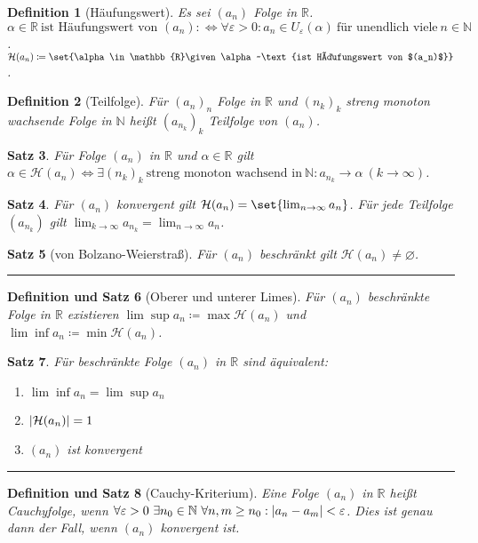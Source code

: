\documentclass[a4paper]{article}
\newcounter{Sec}
\theoremstyle{marginbreak}
\newtheorem{definition}{Definition}[Sec]
\newtheorem{satz}[definition]{Satz}
\newtheorem{defsatz}[definition]{Definition und Satz}
\newcommand{\sep}{%
	\rule{\textwidth}{0.3pt}%
	\stepcounter{Sec}%
	}
\newcommand{\defiff}{:\Longleftrightarrow}
\begin{document}
	\begin{definition}[Häufungswert]
		Es sei $(a_n)$ Folge in $\mathbb{R}$. $\alpha\in\mathbb{R}~\text{ist Häufungswert von $(a_n)$}\defiff\forall\varepsilon>0:a_n\in
		U_\varepsilon(\alpha)~\text{für unendlich viele}~n\in\mathbb{N}$. $\mathcal{H}(a_n)\coloneqq\set{\alpha\in\mathbb{R}\given
		\alpha~\text{ist Häufungswert von $(a_n)$}}$.
	\end{definition}
	\begin{definition}[Teilfolge]
		Für $(a_n)_n$ Folge in $\mathbb{R}$ und $(n_k)_k$ streng monoton wachsende
		Folge in $\mathbb{N}$ heißt $(a_{n_k})_k$ Teilfolge von $(a_n)$.
	\end{definition}
	\begin{satz}
		Für Folge $(a_n)$ in $\mathbb{R}$ und $\alpha\in\mathbb{R}$ gilt
		$\alpha\in\mathcal{H}(a_n)\iff\exists (n_k)_k~\text{streng monoton wachsend in}~\mathbb{N}:a_{n_k}\to\alpha~(k\to\infty)$.
	\end{satz}
	\begin{satz}
		Für $(a_n)$ konvergent gilt $\mathcal{H}(a_n)=\set{\lim_{n\to\infty} a_n}$. Für jede Teilfolge $(a_{n_k})$ gilt
		$\lim_{k\to\infty} a_{n_k} = \lim_{n\to\infty} a_n$.
	\end{satz}
	\begin{satz}[von Bolzano-Weierstraß]
		Für $(a_n)$ beschränkt gilt $\mathcal{H}(a_n)\neq\varnothing$.
	\end{satz}
	\sep
	\begin{defsatz}[Oberer und unterer Limes]
		Für $(a_n)$ beschränkte Folge in $\mathbb{R}$ existieren $\lim\sup a_n\coloneqq\max\mathcal{H}(a_n)$
		und $\lim\inf a_n\coloneqq\min\mathcal{H}(a_n)$.
	\end{defsatz}
	\begin{satz}
		Für beschränkte Folge $(a_n)$ in $\mathbb{R}$ sind äquivalent:
		\begin{enumerate}[label=(\alph*)]
			\item $\lim\inf a_n=\lim\sup a_n$
			\item $\abs{\mathcal{H}(a_n)} = 1$
			\item $(a_n)$ ist konvergent
		\end{enumerate}
	\end{satz}
	\sep
	\begin{defsatz}[Cauchy-Kriterium]
		Eine Folge $(a_n)$ in $\mathbb{R}$ heißt Cauchyfolge, wenn
		$\forall\varepsilon>0~\exists n_0\in\mathbb{N}~\forall n,m\geq n_0:\abs{a_n-a_m}<\varepsilon$.
		Dies ist genau dann der Fall, wenn $(a_n)$ konvergent ist.
	\end{defsatz}
\end{document}
